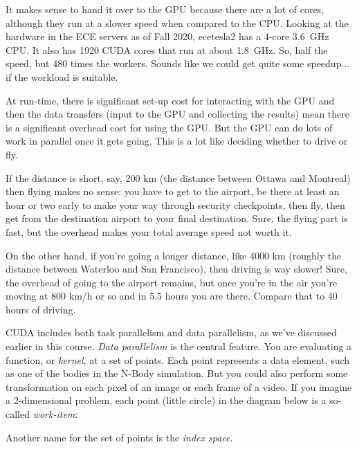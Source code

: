 It makes sense to hand it over to the GPU because there are a lot of cores, although they run at a slower speed when compared to the CPU. Looking at the hardware in the ECE servers as of Fall 2020, ecetesla2 has a 4-core 3.6~GHz CPU. It also has 1920 CUDA cores that run at about 1.8~GHz. So, half the speed, but 480 times the workers. Sounds like we could get quite some speedup... if the workload is suitable.

At run-time, there is significant set-up cost for interacting with the GPU and then the data transfers (input to the GPU and collecting the results) mean there is a significant overhead cost for using the GPU. But the GPU can do lots of work in parallel once it gets going. This is a lot like deciding whether to drive or fly. 

If the distance is short, say, 200 km (the distance between Ottawa and Montreal) then flying makes no sense: you have to get to the airport, be there at least an hour or two early to make your way through security checkpoints, then fly, then get from the destination airport to your final destination. Sure, the flying part is fast, but the overhead makes your total average speed not worth it.

On the other hand, if you're going a longer distance, like 4000 km (roughly the distance between Waterloo and San Francisco), then driving is way slower! Sure, the overhead of going to the airport remains, but once you're in the air you're moving at 800 km/h or so and in 5.5 hours you are there. Compare that to 40 hours of driving.

CUDA includes both task parallelism and data parallelism, as we've
discussed earlier in this course. \emph{Data parallelism} is the central
feature. You are evaluating a function, or \emph{kernel},
at a set of points. Each point represents a data element, such as one of the
bodies in the N-Body simulation. But you could also perform some 
transformation on each pixel of an image or each frame of a video. If you 
imagine a 2-dimensional problem, each point (little circle) in the diagram below is
a so-called \emph{work-item}:

\begin{center}
\end{center}

Another name for the set of points is the \emph{index space}. 

